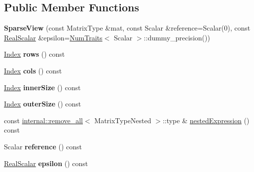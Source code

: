 \subsection*{Public Member Functions}
\begin{DoxyCompactItemize}
\item 
\mbox{\label{class_eigen_1_1_sparse_view_a3999bdfde1e4e35c3a60e33f190257c0}} 
{\bfseries Sparse\+View} (const Matrix\+Type \&mat, const Scalar \&reference=Scalar(0), const \mbox{\hyperlink{class_eigen_1_1_sparse_matrix_base_aaec8ace6efb785c81d442931c3248d88}{Real\+Scalar}} \&epsilon=\mbox{\hyperlink{struct_eigen_1_1_num_traits}{Num\+Traits}}$<$ Scalar $>$\+::dummy\+\_\+precision())
\item 
\mbox{\label{class_eigen_1_1_sparse_view_af6b051d0399363f5b73a316964ee4e12}} 
\mbox{\hyperlink{struct_eigen_1_1_eigen_base_a554f30542cc2316add4b1ea0a492ff02}{Index}} {\bfseries rows} () const
\item 
\mbox{\label{class_eigen_1_1_sparse_view_aea18dd1a3f1e8adef8daa7c12b40354e}} 
\mbox{\hyperlink{struct_eigen_1_1_eigen_base_a554f30542cc2316add4b1ea0a492ff02}{Index}} {\bfseries cols} () const
\item 
\mbox{\label{class_eigen_1_1_sparse_view_ad1436b70d5f02ab8f9c3d350471f0fda}} 
\mbox{\hyperlink{struct_eigen_1_1_eigen_base_a554f30542cc2316add4b1ea0a492ff02}{Index}} {\bfseries inner\+Size} () const
\item 
\mbox{\label{class_eigen_1_1_sparse_view_ac40f96dad4dfd0c1da388fb358dcbdea}} 
\mbox{\hyperlink{struct_eigen_1_1_eigen_base_a554f30542cc2316add4b1ea0a492ff02}{Index}} {\bfseries outer\+Size} () const
\item 
const \mbox{\hyperlink{struct_eigen_1_1internal_1_1remove__all}{internal\+::remove\+\_\+all}}$<$ Matrix\+Type\+Nested $>$\+::type \& \mbox{\hyperlink{class_eigen_1_1_sparse_view_a50f53a9405017012077ae907959aca14}{nested\+Expression}} () const
\item 
\mbox{\label{class_eigen_1_1_sparse_view_a797256d1cc36d3f4c3c20e0cfd4f2103}} 
Scalar {\bfseries reference} () const
\item 
\mbox{\label{class_eigen_1_1_sparse_view_afb19356d22b6e402c5d8a5adda3e4eda}} 
\mbox{\hyperlink{class_eigen_1_1_sparse_matrix_base_aaec8ace6efb785c81d442931c3248d88}{Real\+Scalar}} {\bfseries epsilon} () const
\end{DoxyCompactItemize}
